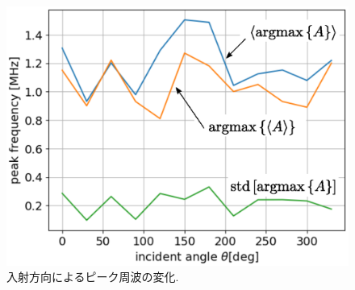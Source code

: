\begin{figure}[h]
	\begin{center}
	\includegraphics[width=0.8\linewidth]{Figs/fig13.eps} 
	\end{center}
	\caption{
		入射方向によるピーク周波の変化.
	} 
	\label{fig:fig13}
\end{figure}

